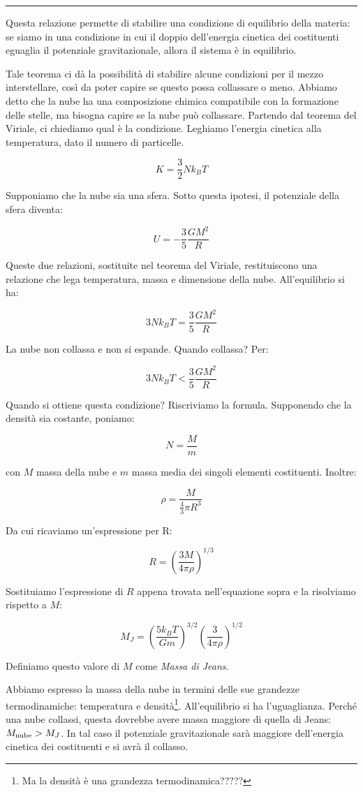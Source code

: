 \rule[7pt]{\linewidth}{0.4pt}

Questa relazione permette di stabilire una condizione di equilibrio della materia: se siamo in una condizione in cui il doppio dell'energia cinetica dei costituenti eguaglia il potenziale gravitazionale, allora il sistema è in equilibrio.

Tale teorema ci dà la possibilità di stabilire alcune condizioni per il mezzo interstellare, così da poter capire se questo possa collassare o meno. Abbiamo detto che la nube ha una composizione chimica compatibile con la formazione delle stelle, ma bisogna capire se la nube può collassare. Partendo dal teorema del Viriale, ci chiediamo qual è la condizione. Leghiamo l'energia cinetica alla temperatura, dato il numero di particelle.

$$K=\frac{3}{2} N k_{B} T$$

Supponiamo che la nube sia una sfera. Sotto questa ipotesi, il potenziale della sfera diventa:

$$U=-\frac{3}{5} \frac{GM^{2}}{R}$$

Queste due relazioni, sostituite nel teorema del Viriale, restituiscono una relazione che lega temperatura, massa e dimensione della nube. All'equilibrio si ha:

$$3Nk_{B}T=\frac{3}{5} \frac{GM^{2}}{R}$$

La nube non collassa e non si espande. Quando collassa? Per:

$$3Nk_{B}T <\frac{3}{5} \frac{GM^{2}}{R}$$

Quando si ottiene questa condizione? Riscriviamo la formula. Supponendo che la densità sia costante, poniamo:

$$N=\frac{M}{m}$$

con $M$ massa della nube e $m$ massa media dei singoli elementi costituenti. Inoltre:

$$\rho = \frac{M}{\frac{4}{3}\pi R^{3}}$$

Da cui ricaviamo un'espressione per R:

$$R=\left( \frac{3M}{4\pi \rho} \right)^{1/3}$$

Sostituiamo l'espressione di $R$ appena trovata nell'equazione sopra e la risolviamo rispetto a $M$:

$$M_{J}=\left( \frac{5k_{B}T}{Gm} \right)^{3/2} \left(\frac{3}{4\pi \rho} \right)^{1/2}$$

Definiamo questo valore di $M$ come \textit{Massa di Jeans}.

Abbiamo espresso la massa della nube in termini delle sue grandezze termodinamiche: temperatura e densità\footnote{Ma la densità è una grandezza termodinamica?????}. All'equilibrio si ha l'uguaglianza. Perché una nube collassi, questa dovrebbe avere massa maggiore di quella di Jeans: $M_{\rm nube}>M_{J}$. In tal caso il potenziale gravitazionale sarà maggiore dell'energia cinetica dei costituenti e si avrà il collasso.

